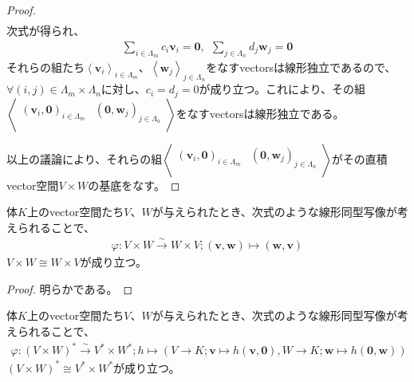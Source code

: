 \documentclass[dvipdfmx]{jsarticle}
\begin{document}
\begin{proof}
\begin{align*}
\end{align*}
次式が得られ、
\begin{align*}
\sum_{i \in \varLambda_{m}} {c_{i}\mathbf{v}_{i}} = \mathbf{0},\ \ \sum_{j \in \varLambda_{n}} {d_{j}\mathbf{w}_{j}} = \mathbf{0}
\end{align*}
それらの組たち$\left\langle \mathbf{v}_{i} \right\rangle_{i \in \varLambda_{m}}$、$\left\langle \mathbf{w}_{j} \right\rangle_{j \in \varLambda_{n}}$をなすvectorsは線形独立であるので、$\forall(i,j) \in \varLambda_{m} \times \varLambda_{n}$に対し、$c_{i} = d_{j} = 0$が成り立つ。これにより、その組$\left\langle \begin{matrix}
\left( \mathbf{v}_{i},\mathbf{0} \right)_{i \in \varLambda_{m}} & \left( \mathbf{0},\mathbf{w}_{j} \right)_{j \in \varLambda_{n}} \\
\end{matrix} \right\rangle$をなすvectorsは線形独立である。\par
以上の議論により、それらの組$\left\langle \begin{matrix}
\left( \mathbf{v}_{i},\mathbf{0} \right)_{i \in \varLambda_{m}} & \left( \mathbf{0},\mathbf{w}_{j} \right)_{j \in \varLambda_{n}} \\
\end{matrix} \right\rangle$がその直積vector空間$V \times W$の基底をなす。
\end{proof}
\begin{thm}\label{2.4.9.5}
体$K$上のvector空間たち$V$、$W$が与えられたとき、次式のような線形同型写像が考えられることで、
\begin{align*}
\varphi:V \times W\overset{\sim}{\rightarrow}W \times V;\left( \mathbf{v},\mathbf{w} \right) \mapsto \left( \mathbf{w},\mathbf{v} \right)
\end{align*}
$V \times W \cong W \times V$が成り立つ。
\end{thm}
\begin{proof} 明らかである。
\end{proof}
\begin{thm}\label{2.4.9.6}
体$K$上のvector空間たち$V$、$W$が与えられたとき、次式のような線形同型写像が考えられることで、
\begin{align*}
\varphi:(V \times W)^{*}\overset{\sim}{\rightarrow}V^{*} \times W^{*};h \mapsto \left( V \rightarrow K;\mathbf{v} \mapsto h\left( \mathbf{v},\mathbf{0} \right),W \rightarrow K;\mathbf{w} \mapsto h\left( \mathbf{0},\mathbf{w} \right) \right)
\end{align*}
$(V \times W)^{*} \cong V^{*} \times W^{*}$が成り立つ。
\end{thm}
\end{document}
